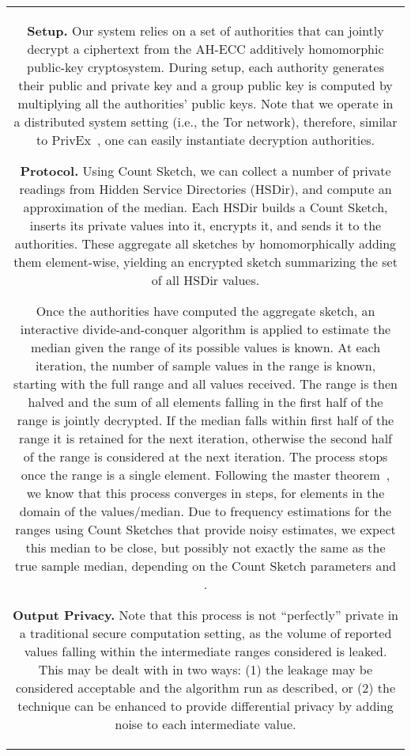 \documentclass[conference]{IEEEtran}
\newcommand{\descr}[1]{\medskip \noindent \textbf{#1}}
\begin{document}
\begin{figure*}[ht!]
{\begin{tabular}{|c|}
\descr{Setup.} Our system relies on a set of authorities that can jointly decrypt a ciphertext from the AH-ECC additively homomorphic public-key cryptosystem.
During setup, each authority generates their public and private key and a group public key is computed by multiplying all the authorities' public keys. 
Note that we operate in a distributed system setting (i.e., the Tor network), therefore, similar to PrivEx~\cite{elahi2014privex}, one can easily instantiate decryption authorities.


\descr{Protocol.} Using Count Sketch, we can collect a number of private readings from Hidden Service Directories (HSDir), and compute an approximation of the median. 
Each HSDir builds a Count Sketch, inserts its private values into it, encrypts it, and sends it to the authorities. These aggregate all sketches by homomorphically adding them element-wise, yielding an encrypted sketch summarizing the set of all HSDir values. 

Once the authorities have computed the aggregate sketch, an interactive divide-and-conquer algorithm is applied to estimate the median given the range of its possible values is known. At each iteration, the number of sample values in the range is known, starting with the full range and all values received. The range is then halved and the sum of all elements falling in the first half of the range is jointly decrypted. If the median falls within first half of the range it is retained for the next iteration, otherwise the second half of the range is considered at the next iteration. The process stops once the range is a single element. 
Following the master theorem~\cite{cormen2001introduction}, we know that this process converges in  steps, for   elements in the domain of the values/median. Due to frequency estimations for the ranges using Count Sketches that provide noisy estimates, we expect this median to be close, but possibly not exactly the same as the true sample median, depending on the Count Sketch parameters  and .

\descr{Output Privacy.} Note that this process is not ``perfectly'' private in a traditional secure computation setting, as the volume of reported values falling within the intermediate ranges considered is leaked. This may be dealt with in two ways: (1) the leakage may be considered acceptable and the algorithm run as described, or (2) the technique can be enhanced to provide differential privacy by adding noise to each intermediate value.


\end{tabular}}
\end{figure*}
\end{document}
